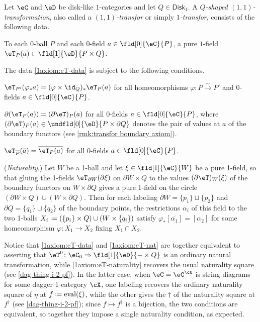 \documentclass[12pt,reqno]{amsart}
\newcounter{alpha}\renewcommand\thealpha{\upshape\Alph{alpha}}
\newcommand{\Disk}{\mathsf{Disk}}
\newcommand{\eval}{\mathrm{eval}}
\newcommand{\C}{\eC}
\newcommand{\D}{\eD}
\newcommand{\fcj}[1]{\overline{#1}}
\newcommand{\orev}{\overline}
\newcommand{\defn}[1]{\emph{#1}}
\renewcommand{\amalg}{\sqcup}
\DeclareRobustCommand{\coloneq}{\mathrel{\vcenter{\baselineskip0.5ex\lineskiplimit0pt\hbox{\scriptsize{\upshape.}}\hbox{\scriptsize{\upshape.}}}}=}
\begin{document}
\begin{definition}
\label{def: DL 1-transfor}
Let $\C$ and $\D$ be disk-like $1$-categories and let $Q\in\Disk_1$.
A \defn{$Q$-shaped $(1,1)$-transformation}, also called a \defn{$(1,1)$-transfor} or simply \defn{$1$-transfor}, consists of the following data.
\begin{lst}
\item[(D$\eT$)]\label{1axiom:eT-data}
To each 0-ball $P$ and each 0-field $a\in\fld[0]{\C}{P}$, a pure $1$-field $\eT_P(a)\in\fld[1]{\D}{P\times Q}$.
\end{lst}
The data \ref{1axiom:eT-data} is subject to the following conditions.
\begin{lst}
\item[($\eT\varphi$)]\label{1axiom:eT-nat}
$\eT_{P'}(\varphi_*a) = (\varphi\times\id_Q)_*\eT_P(a)$ for all homeomorphisms $\varphi\colon P\overset\sim\to P'$ and 0-fields $a\in\fld[0]{\C}{P}$.

\item[($\eT\partial$)]\label{1axiom:eT-boundary} 
$\partial(\eT_P(a)) = (\partial\eT)_P(a)$ for all 0-fields $a\in\fld[0]{\C}{P}$, where $(\partial\eT)_P(a)\in\undfld[0]{\D}{P\times\partial Q}$ denotes the pair of values at $a$ of the boundary functors (see \cref{rmk:transfor boundary axiom}).

\item[($\eT\kern.2ex\fcj{\,\cdot\,}$)]\label{1axiom:eT-refl} 
$\eT_{\orev{P}}(\fcj{a}) = \fcj{\eT_P(a)}$ for all 0-fields $a\in\fld[0]{\C}{P}$.

\item[($\eT\kern0.2ex\Box$)]\label{1axiom:eT-naturality}
(\emph{Naturality}.) Let $W$ be a 1-ball and let $\xi\in\fld[1]{\C}{W}$ be a pure 1-field, so that gluing the 1-fields $\eT_{\partial W}(\partial\xi)$ on $\partial W\times Q$ to the values $(\partial\eT)_W(\xi)$ of the boundary functors on $W\times\partial Q$ gives a pure 1-field on the circle $(\partial W\times Q)\cup(W\times\partial Q)$. Then for each labeling $\partial W=\{p_1\}\amalg\{p_2\}$ and $\partial Q=\{q_1\}\amalg\{q_2\}$ of the boundary points, the restrictions $\alpha_i$ of this field to the two 1-balls $X_i\coloneq(\{p_i\}\times Q)\cup(W\times\{q_i\})$ satisfy $\varphi_*[\fcj{\alpha_1}]=[\alpha_2]$ for some homeomorphism $\varphi\colon X_1\to X_2$ fixing $X_1\cap X_2$.
\end{lst}
\end{definition}

Notice that \ref{1axiom:eT-data} and \ref{1axiom:eT-nat} are together equivalent to asserting that $\eT^0\colon\C_0\Rightarrow\fld[1]{\D}{-\times Q}$ is an ordinary natural transformation, while \ref{1axiom:eT-naturality} recovers the usual naturality square (see \cref{dag-thing-i-2-pf}). In the latter case, when $\C=\C^\cX$ is string diagrams for some dagger 1-category $\cX$, one labeling recovers the ordinary naturality square of $\eta$ at $f\coloneq\eval(\xi)$, while the other gives the $\dag$ of the naturality square at $f^\dag$ (see \cref{dag-thing-i-2-pf}); since $f\mapsto f^\dag$ is a bijection, the two conditions are equivalent, so together they impose a single naturality condition, as expected.
\end{document}
